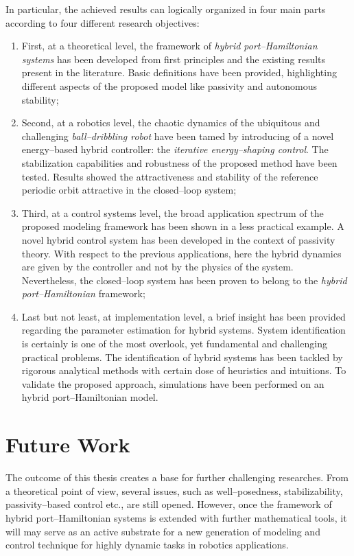%
In particular, the achieved results can logically organized in four main parts according to four different research objectives:
%
%
\begin{enumerate}
	\item  First, at a theoretical level, the framework of \textit{hybrid port--Hamiltonian systems} has been developed from first principles and the existing results present in the literature. Basic definitions have been provided, highlighting different aspects of the proposed model like passivity and autonomous stability;\newline
	\item Second, at a robotics level, the chaotic dynamics of the ubiquitous and challenging \textit{ball--dribbling robot} have been tamed by introducing of a novel energy--based hybrid controller: the \textit{iterative energy--shaping control}. The stabilization capabilities and robustness of the proposed method have been tested. Results showed the attractiveness and stability of the reference periodic orbit attractive in the closed--loop system;\newline
	\item Third, at a control systems level, the broad application spectrum of the proposed modeling framework has been shown in a less practical example. A novel hybrid control system has been developed in the context of passivity theory. With respect to the previous applications, here the hybrid dynamics are given by the controller and not by the physics of the system. Nevertheless, the closed--loop system has been proven to belong to the \textit{hybrid port--Hamiltonian} framework;\newline
	\item Last but not least, at implementation level, a brief insight has been provided regarding the parameter estimation for hybrid systems. System identification is certainly is one of the most overlook, yet fundamental and challenging practical problems. The identification of hybrid systems has been tackled by rigorous analytical methods with certain dose of heuristics and intuitions. To validate the proposed approach, simulations have been performed on an hybrid port--Hamiltonian model.    
\end{enumerate}
%
\clearpage
\section{Future Work}
%
The outcome of this thesis creates a base for further challenging researches. From a theoretical point of view, several issues, such as  well--posedness, stabilizability, passivity--based control etc., are still opened.
However, once the framework of hybrid port--Hamiltonian systems is extended with further mathematical tools, it will may serve as an active substrate for a new generation of modeling and control technique for highly dynamic tasks in robotics applications. 
%
\newline


